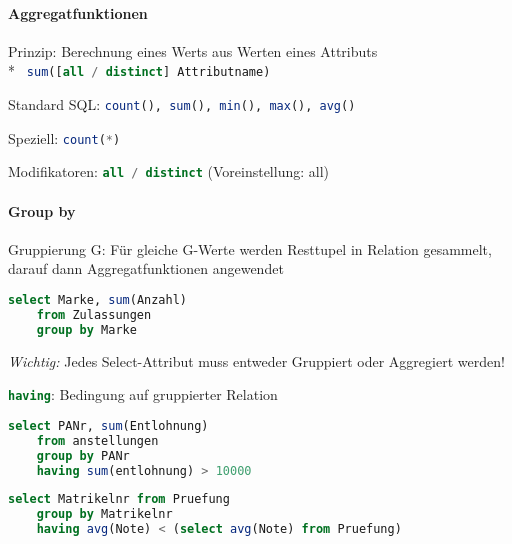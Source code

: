 \paragraph{Aggregatfunktionen}
\begin{items}
	\item Prinzip: Berechnung eines Werts aus Werten eines Attributs\\*
		\lstinline[language=sql]{ sum([all / distinct] Attributname) }
	\item Standard SQL: \lstinline[language=sql]{count(), sum(), min(), max(), avg()}
	\item Speziell: \lstinline[language=sql]{count(*)}
	\item Modifikatoren: \lstinline[language=sql]{all / distinct} (Voreinstellung: all)
\end{items}

\paragraph{Group by}
\begin{items}
	\item Gruppierung G: Für gleiche G-Werte werden Resttupel in Relation gesammelt, darauf dann Aggregatfunktionen angewendet
	\item
	\begin{lstlisting}[language=sql]
select Marke, sum(Anzahl)
	from Zulassungen
	group by Marke
	\end{lstlisting}
	\item \emph{Wichtig:} Jedes Select-Attribut muss entweder Gruppiert oder Aggregiert werden!
	\item \lstinline[language=sql]{having}: Bedingung auf gruppierter Relation
	\begin{lstlisting}[language=sql]
select PANr, sum(Entlohnung)
	from anstellungen
	group by PANr
	having sum(entlohnung) > 10000
	\end{lstlisting}
	
	\item
	\begin{lstlisting}[language=sql]
select Matrikelnr from Pruefung
	group by Matrikelnr
	having avg(Note) < (select avg(Note) from Pruefung)
	\end{lstlisting}
\end{items}



